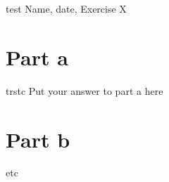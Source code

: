 \documentclass{article}
\begin{document}
test
Name, date, Exercise X

\section*{Part a}
trstc
Put your answer to part a here

\section*{Part b}

etc
\end{document}
